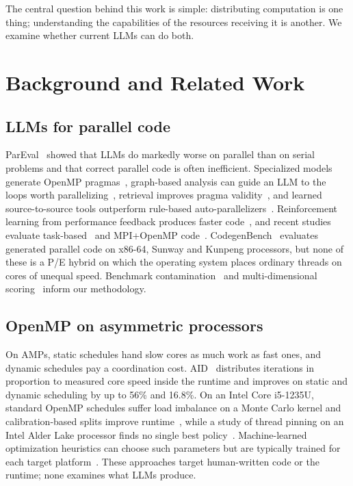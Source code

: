 \documentclass[conference]{IEEEtran}
\begin{document}
The central question behind this work is simple: distributing computation is one thing; understanding the capabilities of the resources receiving it is another. We examine whether current LLMs can do both.

\section{Background and Related Work}
\subsection{LLMs for parallel code}
ParEval~\cite{nichols2024pareval} showed that LLMs do markedly worse on parallel than on serial problems and that correct parallel code is often inefficient. Specialized models generate OpenMP pragmas~\cite{chen2024ompgpt}, graph-based analysis can guide an LLM to the loops worth parallelizing~\cite{mahmud2025autoparllm}, retrieval improves pragma validity~\cite{abdullah2025p4omp}, and learned source-to-source tools outperform rule-based auto-parallelizers~\cite{kadosh2024ompar}. Reinforcement learning from performance feedback produces faster code~\cite{nichols2024rlpf}, and recent studies evaluate task-based~\cite{bantel2026tasks} and MPI+OpenMP code~\cite{diehl2026llmhpc}. CodegenBench~\cite{codegenbench2026} evaluates generated parallel code on x86-64, Sunway and Kunpeng processors, but none of these is a P/E hybrid on which the operating system places ordinary threads on cores of unequal speed. Benchmark contamination~\cite{chen2025dycodeeval} and multi-dimensional scoring~\cite{pcebench2025} inform our methodology.

\subsection{OpenMP on asymmetric processors}
On AMPs, static schedules hand slow cores as much work as fast ones, and dynamic schedules pay a coordination cost. AID~\cite{saez2020aid} distributes iterations in proportion to measured core speed inside the runtime and improves on static and dynamic scheduling by up to 56\% and 16.8\%. On an Intel Core i5-1235U, standard OpenMP schedules suffer load imbalance on a Monte Carlo kernel and calibration-based splits improve runtime~\cite{beserra2026amp}, while a study of thread pinning on an Intel Alder Lake processor finds no single best policy~\cite{sscad_pinning}. Machine-learned optimization heuristics can choose such parameters but are typically trained for each target platform~\cite{wang2018mlcompiler}. These approaches target human-written code or the runtime; none examines what LLMs produce.
\end{document}

